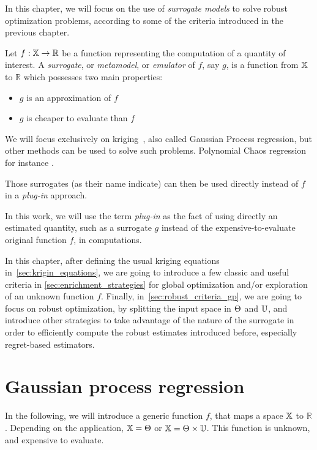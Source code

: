 \documentclass[../../Main_ManuscritThese.tex]{subfiles}
\begin{document}
In this chapter, we will focus on the use of \emph{surrogate models}
to solve robust optimization problems, according to some of the
criteria introduced in the previous chapter.
\begin{definition}
  Let $f: \mathbb{X} \rightarrow \mathbb{R}$ be a function representing
  the computation of a quantity of interest. A \emph{surrogate}, or
  \emph{metamodel}, or \emph{emulator} of $f$, say $g$, is a function
  from $\mathbb{X}$ to $\mathbb{R}$ which possesses two main properties:
  \begin{itemize}
  \item $g$ is an approximation of $f$
  \item $g$ is cheaper to evaluate than $f$ 
  \end{itemize}
\end{definition}
We will focus exclusively on
kriging~\cite{krige_statistical_1951,matheron_traite_1962}, also
called Gaussian Process regression, but other methods can be used to
solve such problems. Polynomial Chaos regression for instance
\cite{wiener_homogeneous_1938,xiu_wiener--askey_2002,sudret_polynomial_2015,miranda_adjoint-based_2016}. %

Those surrogates (as their name indicate) can then be used directly
instead of $f$ in a \emph{plug-in} approach.
\begin{definition}
  \label{def:plugin}
  In this work, we will use the term \emph{plug-in} as the fact of
  using directly an estimated quantity, such as a surrogate $g$
  instead of the expensive-to-evaluate original function $f$, in
  computations.
\end{definition}

In this chapter, after defining the usual kriging equations
in~\cref{sec:krigin_equations}, we are going to introduce a few
classic and useful criteria in \cref{sec:enrichment_strategies} for
global optimization and/or exploration of an unknown function
$f$. Finally, in~\cref{sec:robust_criteria_gp}, we are going to focus
on robust optimization, by splitting the input space in $\Theta$ and
$\mathbb{U}$, and introduce other strategies to take advantage of the
nature of the surrogate in order to efficiently compute the robust
estimates introduced before, especially regret-based estimators.

\section{Gaussian process regression}
In the following, we will introduce a generic function $f$, that maps
a space $\mathbb{X}$ to $\mathbb{R}$. Depending on the application,
$\mathbb{X} = \Theta$ or $\mathbb{X} = \Theta \times \mathbb{U}$. This
function is unknown, and expensive to evaluate.
\end{document}
